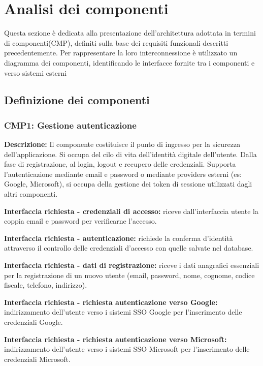 \setcounter{section}{1}
\setlength{\parindent}{0pt}  %
\setlength{\parskip}{6pt}  
\section{Analisi dei componenti}
Questa sezione è dedicata alla presentazione dell'architettura
adottata in termini di componenti(CMP), definiti
sulla base dei requisiti funzionali descritti precedentemente.
Per rappresentare la loro interconnessione è utilizzato un
diagramma dei componenti, identificando le interfacce fornite
tra i componenti e verso sistemi esterni


\subsection{Definizione dei componenti}
\subsubsection*{CMP1: Gestione autenticazione}
\textbf{Descrizione:} Il componente costituisce il punto di ingresso per la sicurezza dell'applicazione.
Si occupa del cilo di vita dell'identità digitale dell'utente. Dalla fase di registrazione, al login,
logout e recupero delle credenziali. Supporta l'autenticazione mediante email e password o
mediante providers esterni (es: Google, Microsoft), si occupa della gestione dei token di sessione
utilizzati dagli altri componenti.

\textbf{Interfaccia richiesta - credenziali di accesso:}
riceve dall'interfaccia utente la coppia email e password per verificarne l'accesso.

\textbf{Interfaccia richiesta - autenticazione:}
richiede la conferma d'identità attraverso il controllo delle credenziali d'accesso con
quelle salvate nel database.

\textbf{Interfaccia richiesta - dati di registrazione:}
riceve i dati anagrafici essenziali per la registrazione di un nuovo utente (email, password,
nome, cognome, codice fiscale, telefono, indirizzo).


\textbf{Interfaccia richiesta - richiesta autenticazione verso Google:}
indirizzamento dell’utente verso i sistemi SSO Google per l’inserimento delle credenziali Google.

\textbf{Interfaccia richiesta - richiesta autenticazione verso Microsoft:}
indirizzamento dell’utente verso i sistemi SSO Microsoft per l’inserimento delle credenziali Microsoft.

